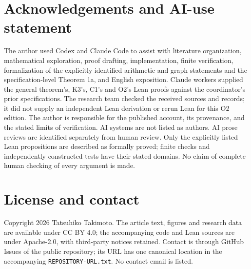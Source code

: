 \documentclass[11pt]{amsart}
\newcommand{\record}[1]{\nolinkurl{#1}}
\theoremstyle{definition}\newtheorem{definition}{Definition}
\begin{document}
\section*{Acknowledgements and AI-use statement}
The author used Codex and Claude Code
to assist with literature organization, mathematical exploration,
proof drafting, implementation, finite verification, formalization of
the explicitly identified arithmetic and graph statements and the
specification-level Theorem 1a, and English exposition. Claude workers
supplied the general theorem's, K3's, C1's and O2's Lean proofs against the
coordinator's prior specifications. The research team checked the
received sources and records; it did not supply an independent Lean
derivation or rerun Lean for this O2 edition. The author is responsible
for the published account, its provenance, and the stated limits of
verification. AI systems are not listed as authors. AI prose reviews
are identified separately from human review. Only the explicitly
listed Lean propositions are described as formally proved; finite
checks and independently constructed tests have their stated domains.
No claim of complete human checking of every argument is made.

\section*{License and contact}
Copyright 2026 Tatsuhiko Takimoto. The article text, figures and research
data are available under CC BY 4.0; the accompanying code and Lean
sources are under Apache-2.0, with third-party notices retained.
Contact is through GitHub Issues of the public repository; its URL
has one canonical location in the accompanying
\record{REPOSITORY-URL.txt}. No contact email is listed.
\end{document}
